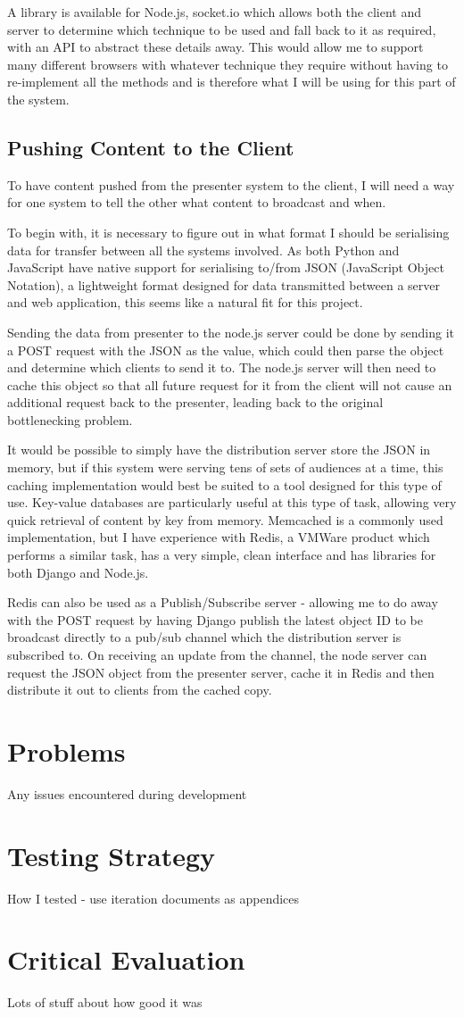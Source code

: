 \documentclass[a4papert,11pt,notitlepage]{ltxdoc}
\begin{document}
A library is available for Node.js, socket.io which allows both the client and server to determine which technique to be used and fall back to it as required, with an API to abstract these details away. This would allow me to support many different browsers with whatever technique they require without having to re-implement all the methods and is therefore what I will be using for this part of the system.

\subsection{Pushing Content to the Client}
To have content pushed from the presenter system to the client, I will need a way for one system to tell the other what content to broadcast and when. 

To begin with, it is necessary to figure out in what format I should be serialising data for transfer between all the systems involved. As both Python and JavaScript have native support for serialising to/from JSON (JavaScript Object Notation), a lightweight format designed for data transmitted between a server and web application, this seems like a natural fit for this project.

Sending the data from presenter to the node.js server could be done by sending it a POST request with the JSON as the value, which could then parse the object and determine which clients to send it to. The node.js server will then need to cache this object so that all future request for it from the client will not cause an additional request back to the presenter, leading back to the original bottlenecking problem.

It would be possible to simply have the distribution server store the JSON in memory, but if this system were serving tens of sets of audiences at a time, this caching implementation would best be suited to a tool designed for this type of use. Key-value databases are particularly useful at this type of task, allowing very quick retrieval of content by key from memory. Memcached is a commonly used implementation, but I have experience with Redis, a VMWare product which performs a similar task, has a very simple, clean interface and has libraries for both Django and Node.js.

Redis can also be used as a Publish/Subscribe server - allowing me to do away with the POST request by having Django publish the latest object ID to be broadcast directly to a pub/sub channel which the distribution server is subscribed to. On receiving an update from the channel, the node server can request the JSON object from the presenter server, cache it in Redis and then distribute it out to clients from the cached copy.

\section{Problems}
Any issues encountered during development

\section{Testing Strategy}
How I tested - use iteration documents as appendices

\section{Critical Evaluation}
Lots of stuff about how good it was


\end{document}
